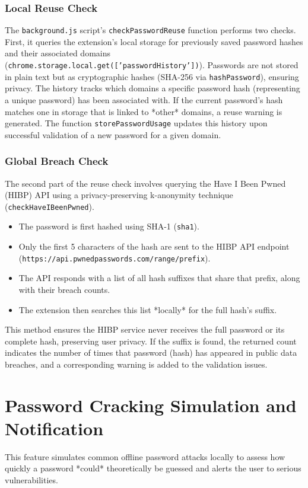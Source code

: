 \documentclass[11pt,oneside,a4paper]{book}
\begin{document}
\subsubsection{Local Reuse Check}
The \texttt{background.js} script's \texttt{checkPasswordReuse} function performs two checks. First, it queries the extension's local storage for previously saved password hashes and their associated domains (\texttt{chrome.storage.local.get(['passwordHistory'])}). Passwords are not stored in plain text but as cryptographic hashes (SHA-256 via \texttt{hashPassword}), ensuring privacy. The history tracks which domains a specific password hash (representing a unique password) has been associated with. If the current password's hash matches one in storage that is linked to *other* domains, a reuse warning is generated. The function \texttt{storePasswordUsage} updates this history upon successful validation of a new password for a given domain.

\subsubsection{Global Breach Check}
The second part of the reuse check involves querying the Have I Been Pwned (HIBP) API using a privacy-preserving k-anonymity technique (\texttt{checkHaveIBeenPwned}).
\begin{itemize}
    \item The password is first hashed using SHA-1 (\texttt{sha1}).
    \item Only the first 5 characters of the hash are sent to the HIBP API endpoint \\(\texttt{https://api.pwnedpasswords.com/range/{prefix}}).
    \item The API responds with a list of all hash suffixes that share that prefix, along with their breach counts.
    \item The extension then searches this list *locally* for the full hash's suffix.
\end{itemize}
This method ensures the HIBP service never receives the full password or its complete hash, preserving user privacy. If the suffix is found, the returned count indicates the number of times that password (hash) has appeared in public data breaches, and a corresponding warning is added to the validation issues.

\section{Password Cracking Simulation and Notification}
This feature simulates common offline password attacks locally to assess how quickly a password *could* theoretically be guessed and alerts the user to serious vulnerabilities.
\end{document}
